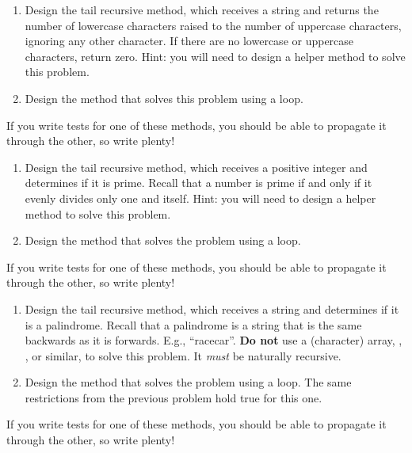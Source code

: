 \begin{enumerate}[label=(\alph*)]
    \item Design the  tail recursive method, which receives a string and returns the number of lowercase characters raised to the number of uppercase characters, ignoring any other character. If there are no lowercase or uppercase characters, return zero. Hint: you will need to design a  helper method to solve this problem.
    \item Design the  method that solves this problem using a loop.
\end{enumerate}
If you write tests for one of these methods, you should be able to propagate it through the other, so write plenty!


\begin{enumerate}[label=(\alph*)]
    \item Design the  tail recursive method, which receives a positive integer and determines if it is prime. Recall that a number is prime if and only if it evenly divides only one and itself. Hint: you will need to design a  helper method to solve this problem.
    \item Design the  method that solves the problem using a loop.
\end{enumerate}

If you write tests for one of these methods, you should be able to propagate it through the other, so write plenty!

\begin{enumerate}[label=(\alph*)]
    \item Design the  tail recursive method, which receives a string and determines if it is a palindrome. Recall that a palindrome is a string that is the same backwards as it is forwards. E.g., ``racecar''. \textbf{Do not} use a (character) array, , , or similar, to solve this problem. It \textit{must} be naturally recursive.
    \item Design the  method that solves the problem using a loop. The same restrictions from the previous problem hold true for this one.
\end{enumerate}

If you write tests for one of these methods, you should be able to propagate it through the other, so write plenty!

